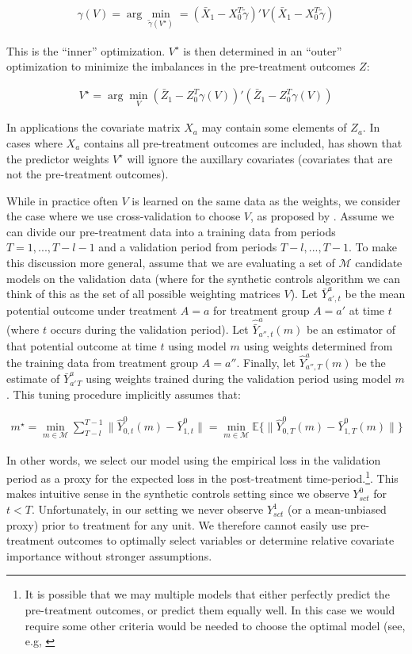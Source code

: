 \begin{align}
\gamma(V) = \arg\min_{\tilde{\gamma}(V^\star)} = (\bar{X}_1 - X_0^T\tilde{\gamma})'V(\bar{X}_1 - X_0^T\tilde{\gamma}) 
\end{align}

This is the ``inner'' optimization. $V^\star$ is then determined in an ``outer'' optimization to minimize the imbalances in the pre-treatment outcomes $Z$:

\begin{align}
    V^\star = \arg\min_V (\bar{Z}_1 - Z_0^T\gamma(V))'(\bar{Z}_1 - Z_0^T\gamma(V))
\end{align}

In applications the covariate matrix $X_a$ may contain some elements of $Z_a$. In cases where $X_a$ contains all pre-treatment outcomes are included, \cite{kaul2015synthetic} has shown that the predictor weights $V^\star$ will ignore the auxillary covariates (covariates that are not the pre-treatment outcomes). 

While in practice often $V$ is learned on the same data as the weights, we consider the case where we use cross-validation to choose $V$, as proposed by \cite{abadie2015comparative}. Assume we can divide our pre-treatment data into a training data from periods $T = 1, ..., T - l - 1$ and a validation period from periods $T - l, ..., T - 1$. To make this discussion more general, assume that we are evaluating a set of $\mathcal{M}$ candidate models on the validation data (where for the synthetic controls algorithm we can think of this as the set of all possible weighting matrices $V$). Let $\bar{Y}^a_{a', t}$ be the mean potential outcome under treatment $A = a$ for treatment group $A = a'$ at time $t$ (where $t$ occurs during the validation period). Let $\hat{\bar{Y}}^a_{a'', t}(m)$ be an estimator of that potential outcome at time $t$ using model $m$ using weights determined from the training data from treatment group $A = a''$. Finally, let $\hat{Y}^a_{a'', T}(m)$ be the estimate of $\bar{Y}_{a'}^a_T$ using weights trained during the validation period using model $m$. This tuning procedure implicitly assumes that:

\begin{align*}
m^\star = \min_{m \in \mathcal{M}}\sum_{T - l}^{T-1}\|\hat{Y}^0_{0, t}(m) - \bar{Y}^0_{1, t}\| = \min_{m \in \mathcal{M}}\mathbb{E}\{\|\hat{Y}^0_{0, T}(m) - \bar{Y}^0_{1, T}(m)\|\}
\end{align*}

In other words, we select our model using the empirical loss in the validation period as a proxy for the expected loss in the post-treatment time-period.\footnote{It is possible that we may multiple models that either perfectly predict the pre-treatment outcomes, or predict them equally well. In this case we would require some other criteria would be needed to choose the optimal model (see, e.g, \cite{becker2017cross}}. This makes intuitive sense in the synthetic controls setting since we observe $Y^0_{sct}$ for $t < T$. Unfortunately, in our setting we never observe $Y^1_{sct}$ (or a mean-unbiased proxy) prior to treatment for any unit. We therefore cannot easily use pre-treatment outcomes to optimally select variables or determine relative covariate importance without stronger assumptions. 

